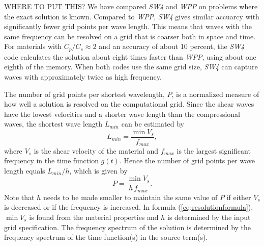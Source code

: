 \documentclass[11pt]{report}
\begin{document}
WHERE TO PUT THIS?  We have compared \emph{SW4} and \emph{WPP} on problems where the exact solution
is known. Compared to \emph{WPP}, \emph{SW4} gives similar accuarcy with significantly fewer grid
points per wave length. This means that waves with the same frequency can be resolved on a grid that
is coarser both in space and time. For materials with $C_p/C_s\approx 2$ and an accuracy of about 10
percent, the \emph{SW4} code calculates the solution about eight times faster than \emph{WPP}, using
about one eighth of the memory. When both codes use the same grid size, \emph{SW4} can capture waves
with approximately twice as high frequency.

The number of grid points per shortest wavelength, $P$, is a normalized measure of how well a
solution is resolved on the computational grid. Since the shear waves have the lowest velocities and
a shorter wave length than the compressional waves, the shortest wave length $L_{min}$ can be
estimated by
\[
 L_{min} = \dfrac{\min V_s}{f_{max}},
\]
where $V_s$ is the shear velocity of the material and $f_{max}$ is the largest significant frequency
in the time function $g(t)$. Hence the number of grid points per wave length equals $L_{min}/h$,
which is given by
%
\begin{equation}\label{eq:resolutionformula}
  P = \dfrac{\min V_s}{h\,f_{max}}. 
\end{equation}
Note that $h$ needs to be made smaller to maintain the same value of $P$ if either $V_s$ is
decreased or if the frequency is increased. In formula (\ref{eq:resolutionformula}), $\min V_s$ is
found from the material properties and $h$ is determined by the input grid specification.  The
frequency spectrum of the solution is determined by the frequency spectrum of the time
function(s) in the source term(s).
\end{document}
